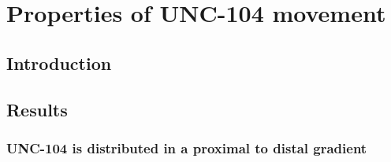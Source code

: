 
\chapter{Properties of UNC-104 movement}

\section{Introduction}
\blindtext {}


\section{Results}

\subsection{UNC-104 is distributed in a proximal to distal gradient}

\blindtext


